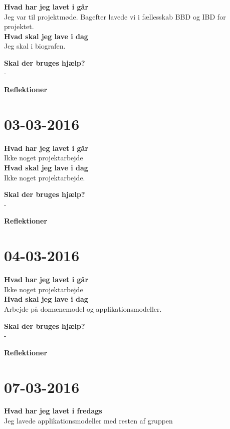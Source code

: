 \documentclass{article}
\begin{document}
	\textbf{Hvad har jeg lavet i går}\\
	Jeg var til projektmøde. Bagefter lavede vi i fællesskab BBD og IBD for projektet.\\
	
	\textbf{Hvad skal jeg lave i dag}\\
	Jeg skal i biografen.    
	
	\textbf{Skal der bruges hjælp?}\\
	-
	
	\textbf{Reflektioner}\\
	
	
	\section{03-03-2016}
	
	\textbf{Hvad har jeg lavet i går}\\
	Ikke noget projektarbejde\\
	
	\textbf{Hvad skal jeg lave i dag}\\
	Ikke noget projektarbejde.    
	
	\textbf{Skal der bruges hjælp?}\\
	-
	
	\textbf{Reflektioner}\\
	
	
	\section{04-03-2016}
	
	\textbf{Hvad har jeg lavet i går}\\
	Ikke noget projektarbejde\\
	
	\textbf{Hvad skal jeg lave i dag}\\
	Arbejde på domænemodel og applikationsmodeller.    
	
	\textbf{Skal der bruges hjælp?}\\
	-
	
	\textbf{Reflektioner}\\
	
	
	\section{07-03-2016}
	
	\textbf{Hvad har jeg lavet i fredags}\\
	Jeg lavede applikationsmodeller med resten af gruppen\\
	
\end{document}
